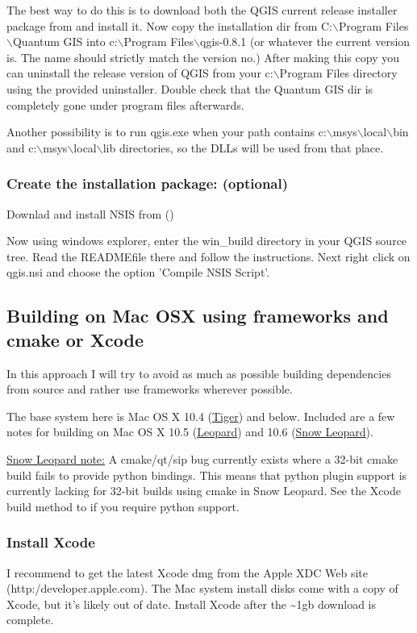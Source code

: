 The best way to do this is to download both the QGIS current release installer
package from  and install it. Now copy
the installation dir from C:$\backslash$Program Files$\backslash$Quantum GIS into c:$\backslash$Program
Files$\backslash$qgis-0.8.1 (or whatever the current version is. The name should strictly
match the version no.) After making this copy you can uninstall the release
version of QGIS from your c:$\backslash$Program Files directory using the provided
uninstaller. Double check that the Quantum GIS dir is completely gone under
program files afterwards.

Another possibility is to run qgis.exe when your path contains
c:$\backslash$msys$\backslash$local$\backslash$bin and c:$\backslash$msys$\backslash$local$\backslash$lib directories, so the DLLs will be
used from that place.

\subsubsection{Create the installation package: (optional)}
Downlad and install NSIS from ()

Now using windows explorer, enter the win\_build directory in your QGIS source
tree. Read the READMEfile there and follow the instructions. Next right click
on qgis.nsi and choose the option 'Compile NSIS Script'. 


\subsection{Building on Mac OSX using frameworks and cmake or Xcode}
In this approach I will try to avoid as much as possible building dependencies
from source and rather use frameworks wherever possible.

The base system here is Mac OS X 10.4 (\underline{Tiger}) and below. Included are a few notes
for building on Mac OS X 10.5 (\underline{Leopard}) and 10.6 (\underline{Snow Leopard}). 

\underline{Snow Leopard note:} A cmake/qt/sip bug currently exists where a 32-bit
cmake build fails to provide python bindings. This means that python plugin support
is currently lacking for 32-bit builds using cmake in Snow Leopard. See the Xcode
build method to if you require python support.

\subsubsection{Install Xcode}
I recommend to get the latest Xcode dmg from the Apple XDC Web site 
(http:/developer.apple.com). The Mac system install disks come with a copy of
Xcode, but it's likely out of date.
Install Xcode after the \~{}1gb download is complete.

